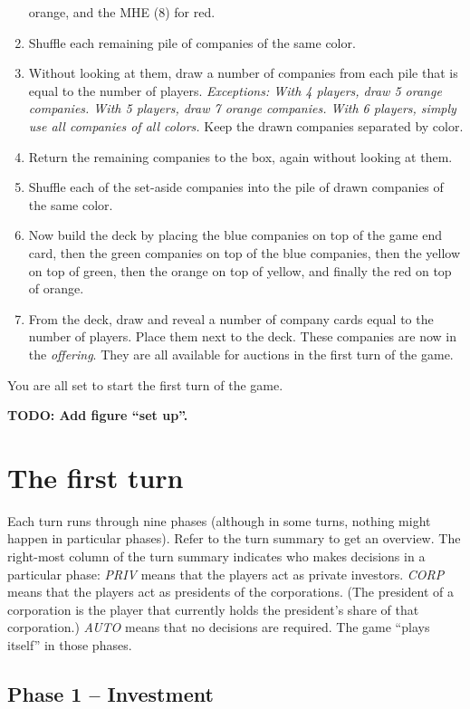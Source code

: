 \documentclass[10pt,final]{report}
\begin{document}
\begin{multicols}{2}
\begin{enumerate}
  orange, and the MHE (8) for red.
\item Shuffle each remaining pile of companies of the same color.
\item Without looking at them, draw a number of companies from each
  pile that is equal to the number of players. \emph{Exceptions: With
    4 players, draw 5 orange companies. With 5 players, draw 7 orange
    companies. With 6 players, simply use all companies of all
    colors.} Keep the drawn companies separated by color.
\item Return the remaining companies to the box, again without looking
  at them.
\item Shuffle each of the set-aside companies into the pile of drawn
  companies of the same color.
\item Now build the deck by placing the blue companies on top of the
  game end card, then the green companies on top of the blue
  companies, then the yellow on top of green, then the orange on top
  of yellow, and finally the red on top of orange.
\item From the deck, draw and reveal a number of company cards equal
  to the number of players. Place them next to the deck. These
  companies are now in the \emph{offering}. They are all available for
  auctions in the first turn of the game.
\end{enumerate}

You are all set to start the first turn of the game.

\textbf{TODO: Add figure ``set up''.}

\section{The first turn}

Each turn runs through nine phases (although in some turns, nothing
might happen in particular phases). Refer to the turn summary to get
an overview. The right-most column of the turn summary indicates who
makes decisions in a particular phase: \emph{PRIV} means that the
players act as private investors. \emph{CORP} means that the players
act as presidents of the corporations. (The president of a corporation
is the player that currently holds the president's share of that
corporation.) \emph{AUTO} means that no decisions are required. The
game ``plays itself'' in those phases.

\subsection{Phase 1 -- Investment}
\label{t1p1}


\end{multicols}
\end{document}
